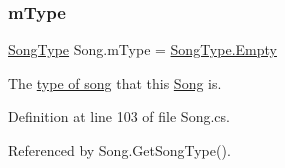 \mbox{\label{group___song_priv_var_gaf3b9d0f461522324f897b746311b43c5}} 
\subsubsection{\texorpdfstring{m\+Type}{mType}}
{\footnotesize\ttfamily \hyperlink{group___song_enums_gae681a1f001333e39fc1cb4fea97bfe1b}{Song\+Type} Song.\+m\+Type = \hyperlink{group___song_enums_ggae681a1f001333e39fc1cb4fea97bfe1bace2c8aed9c2fa0cfbed56cbda4d8bf07}{Song\+Type.\+Empty}\hspace{0.3cm}{\ttfamily [private]}}



The \hyperlink{group___song_enums_gae681a1f001333e39fc1cb4fea97bfe1b}{type of song} that this \hyperlink{class_song}{Song} is. 



Definition at line 103 of file Song.\+cs.



Referenced by Song.\+Get\+Song\+Type().

